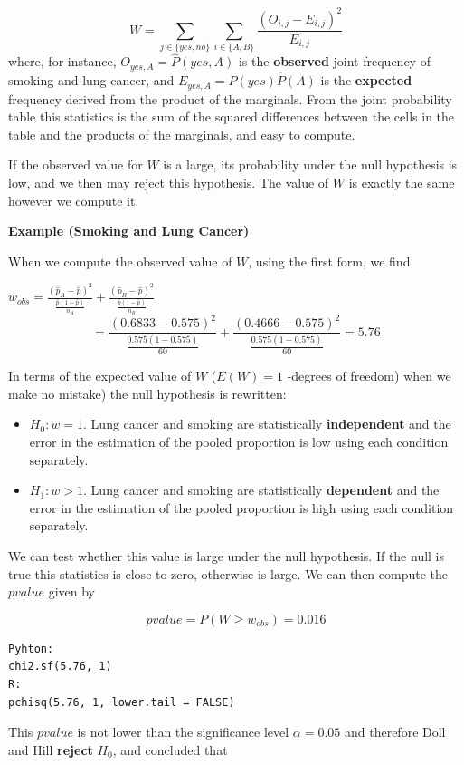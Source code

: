 \documentclass[
]{book}
\begin{document}
\[W= \sum_{j\in\{yes,no\}} \sum_{i\in\{A,B\}} \frac{(O_{i,j} - E_{i,j})^2}{E_{i,j}}\]
where, for instance,
\(O_{yes, A}=\hat{P}(yes,A)\) is the \textbf{observed} joint frequency of smoking and lung cancer, and \(E_{yes, A}=\hat{P}(yes)\hat{P}(A)\) is the \textbf{expected} frequency derived from the product of the marginals. From the joint probability table this statistics is the sum of the squared differences between the cells in the table and the products of the marginals, and easy to compute.

If the observed value for \(W\) is a large, its probability under the null hypothesis is low, and we then may reject this hypothesis. The value of \(W\) is exactly the same however we compute it.

\textbf{Example (Smoking and Lung Cancer)}

When we compute the observed value of \(W\), using the first form, we find

\(w_{obs}= \frac{(\hat{p}_A-\hat{p})^2}{\frac{\hat{p}(1-\hat{p})}{n_A}} +\frac{(\hat{p}_B-\hat{p})^2}{\frac{\hat{p}(1-\hat{p})}{n_B}}\) \[=\frac{(0.6833-0.575)^2}{{\frac{0.575(1-0.575)}{60}}}+ \frac{(0.4666-0.575)^2}{{\frac{0.575(1-0.575)}{60}}}= 5.76\]

In terms of the expected value of \(W\) (\(E(W)=1\) -degrees of freedom) when we make no mistake) the null hypothesis is rewritten:

\begin{itemize}
\item
  \(H_0:w=1\). Lung cancer and smoking are statistically \textbf{independent} and the error in the estimation of the pooled proportion is low using each condition separately.
\item
  \(H_1:w>1\). Lung cancer and smoking are statistically \textbf{dependent} and the error in the estimation of the pooled proportion is high using each condition separately.
\end{itemize}

We can test whether this value is large under the null hypothesis. If the null is true this statistics is close to zero, otherwise is large. We can then compute the \(pvalue\) given by

\[pvalue=P(W \geq w_{obs}) =0.016\]

\begin{verbatim}
Pyhton:
chi2.sf(5.76, 1) 
R:
pchisq(5.76, 1, lower.tail = FALSE)
\end{verbatim}

This \(pvalue\) is not lower than the significance level \(\alpha=0.05\) and therefore Doll and Hill \textbf{reject} \(H_0\), and concluded that
\end{document}

